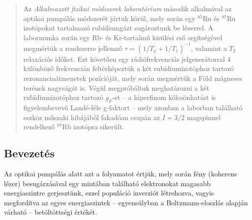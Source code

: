 \begin{abstract}
    \noindent Az \emph{Alkalmazott fizikai módszerek laboratórium} második alkalmával az optikai pumpálás módszerét jártuk körül, mely során egy $^{85}$Ru és $^{87}$Ru izotópokat tartalmazó rubídiumgázt sugároztunk be lézerrel. A labormunka során egy Rb- és Kr-tartalmú kisülési cső segítségével megmértük a rendszerre jellemző $\tau = \left( 1/T_{p} + 1/T_{1} \right)^{-1}$, valamint a $T_{2}$ relaxációs időket. Ezt követően egy rádiófrekvenciás jelgenerátorral $4$ különböző frekvencián feltérképeztük a két rubídiumizotóphoz tartozó rezonanciaátmenetek pozícióját, mely során megmértük a Föld mágneses terének nagyságát is. Végül megpróbáltuk meghatározni a két rubídiumizotóphoz tartozó $g_{F}$-et -- a hiperfinom kölcsönhatást is figyelembevevő Landé-féle g-faktort -- mely azonban a laborban található eszköz műszaki hibájából fakadóan csupán az $I=3/2$ magspinnel rendelkező $^{87}$Rb izotópra sikerült.
\end{abstract}

\begin{multicols}{2}
\section{Bevezetés}
Az optikai pumpálás alatt azt a folyamatot értjük, mely során fény (koherens lézer) besugárzásával egy mintában található elektronokat magasabb energiaszintre gerjesztünk, ezzel populáció inverziót létrehozva, vagyis megfordítva az egyes energiaszintek -- egyensúlyban a Boltzmann-eloszlás alapján várható -- betöltöttségi értékét.

\end{multicols}